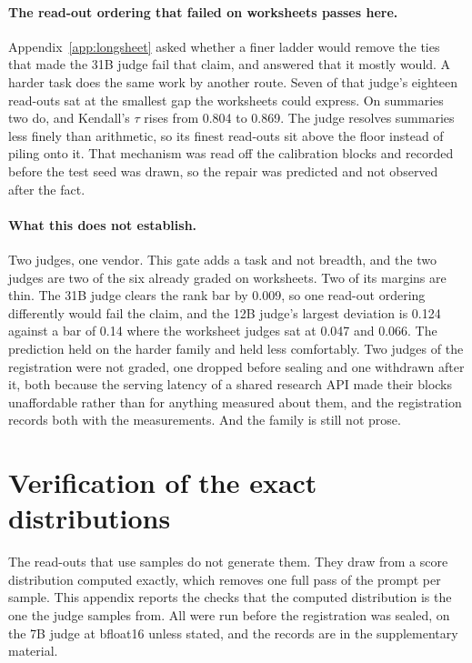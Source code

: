 \documentclass{article}
\theoremstyle{definition}
\theoremstyle{remark}
\begin{document}
\paragraph{The read-out ordering that failed on worksheets passes here.}
Appendix~\ref{app:longsheet} asked whether a finer ladder would remove the ties that made the 31B judge fail that claim, and answered that it mostly would. A harder task does the same work by another route. Seven of that judge's eighteen read-outs sat at the smallest gap the worksheets could express. On summaries two do, and Kendall's $\tau$ rises from 0.804 to 0.869. The judge resolves summaries less finely than arithmetic, so its finest read-outs sit above the floor instead of piling onto it. That mechanism was read off the calibration blocks and recorded before the test seed was drawn, so the repair was predicted and not observed after the fact.

\paragraph{What this does not establish.}
Two judges, one vendor. This gate adds a task and not breadth, and the two judges are two of the six already graded on worksheets. Two of its margins are thin. The 31B judge clears the rank bar by 0.009, so one read-out ordering differently would fail the claim, and the 12B judge's largest deviation is 0.124 against a bar of 0.14 where the worksheet judges sat at 0.047 and 0.066. The prediction held on the harder family and held less comfortably. Two judges of the registration were not graded, one dropped before sealing and one withdrawn after it, both because the serving latency of a shared research API made their blocks unaffordable rather than for anything measured about them, and the registration records both with the measurements. And the family is still not prose.



\section{Verification of the exact distributions}
\label{app:verify}

The read-outs that use samples do not generate them.
They draw from a score distribution computed exactly, which removes one full pass of the prompt per sample.
This appendix reports the checks that the computed distribution is the one the judge samples from.
All were run before the registration was sealed, on the 7B judge at bfloat16 unless stated, and the records are in the supplementary material.
\end{document}
